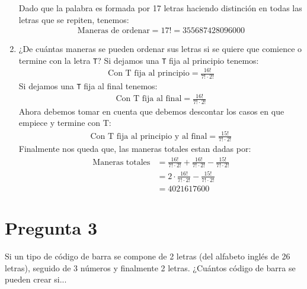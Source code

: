 \documentclass[spanish, fleqn]{article}
\begin{document}
\begin{enumerate}
    Dado que la palabra es formada por 17 letras haciendo distinción en todas las letras que se repiten, tenemos:
    \begin{align*}
    \text{Maneras de ordenar}=17!= 355687428096000
    \end{align*}
    \item ¿De cuántas maneras se pueden ordenar sus letras si se quiere que comience o termine con la letra \texttt{T}?
    Si dejamos una \texttt{T} fija al principio tenemos:
    \begin{align*}
    \text{Con T fija al principio}=\frac{16!}{7!\cdot 2!}
    \end{align*}
    Si dejamos una \texttt{T} fija al final tenemos:
    \begin{align*}
    \text{Con T fija al final}=\frac{16!}{7!\cdot 2!}
    \end{align*}
    Ahora debemos tomar en cuenta que debemos descontar los casos en que empiece y termine con T:
    \begin{align*}
    \text{Con T fija al principio y al final}=\frac{15!}{7!\cdot 2!}
    \end{align*}
    Finalmente nos queda que, las maneras totales estan dadas por:
    \begin{align*}
    \text{Maneras totales}&=\frac{16!}{7!\cdot 2!} + \frac{16!}{7!\cdot 2!} - \frac{15!}{7!\cdot 2!}\\
    &=2 \cdot \frac{16!}{7!\cdot 2!} - \frac{15!}{7!\cdot 2!}\\
	&= 4021617600    
    \end{align*}
    \end{enumerate}
	\section*{Pregunta 3}
    Si un tipo de código de barra se compone de 2 letras 
    (del alfabeto inglés de 26 letras), seguido de 3 números 
    y finalmente 2 letras. ¿Cuántos código de barra se pueden
    crear si...
    
\end{document}
